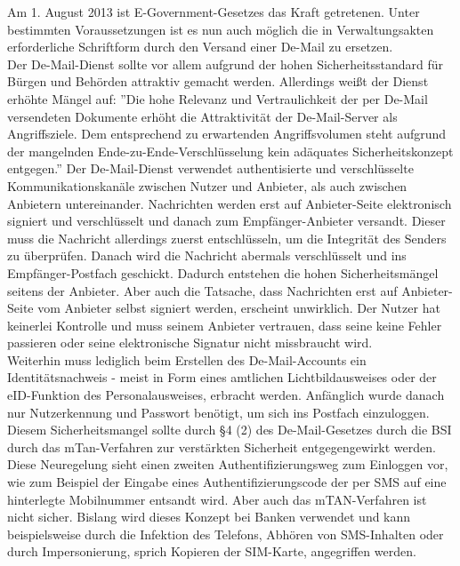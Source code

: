 Am 1. August 2013 ist E-Government-Gesetzes das Kraft getretenen. Unter bestimmten Voraussetzungen ist es nun auch möglich die in Verwaltungsakten erforderliche Schriftform durch den Versand einer De-Mail zu ersetzen. \\
Der De-Mail-Dienst sollte vor allem aufgrund der hohen Sicherheitsstandard für Bürgen und Behörden attraktiv gemacht werden. Allerdings weißt der Dienst erhöhte Mängel auf:
''Die hohe Relevanz und Vertraulichkeit der per De-Mail versendeten Dokumente erhöht die Attraktivität der De-Mail-Server als Angriffsziele. Dem entsprechend zu erwartenden Angriffsvolumen steht aufgrund der mangelnden Ende-zu-Ende-Verschlüsselung kein adäquates Sicherheitskonzept entgegen.'' \textcite{bea:demail:ccc} Der De-Mail-Dienst verwendet authentisierte und verschlüsselte Kommunikationskanäle zwischen Nutzer und Anbieter, als auch zwischen Anbietern untereinander. Nachrichten werden erst auf Anbieter-Seite elektronisch signiert und verschlüsselt und danach zum Empfänger-Anbieter versandt. Dieser muss die Nachricht allerdings zuerst entschlüsseln, um die Integrität des Senders zu überprüfen. Danach wird die Nachricht abermals verschlüsselt und ins Empfänger-Postfach geschickt. Dadurch entstehen die hohen Sicherheitsmängel seitens der Anbieter. Aber auch die Tatsache, dass Nachrichten erst auf Anbieter-Seite vom Anbieter selbst signiert werden, erscheint unwirklich. Der Nutzer hat keinerlei Kontrolle und muss seinem Anbieter vertrauen, dass seine keine Fehler passieren oder seine elektronische Signatur nicht missbraucht wird. \\
Weiterhin muss lediglich beim Erstellen des De-Mail-Accounts ein Identitätsnachweis - meist in Form eines amtlichen Lichtbildausweises oder der eID-Funktion  des Personalausweises, erbracht werden. Anfänglich wurde danach nur Nutzerkennung und Passwort benötigt, um sich ins Postfach einzuloggen. Diesem Sicherheitsmangel sollte durch §4 (2) des De-Mail-Gesetzes durch die BSI durch das mTan-Verfahren zur verstärkten Sicherheit entgegengewirkt werden. Diese Neuregelung sieht einen zweiten Authentifizierungsweg zum Einloggen vor, wie zum Beispiel der Eingabe eines Authentifizierungscode der per SMS auf eine hinterlegte Mobilnummer entsandt wird. Aber auch das mTAN-Verfahren ist nicht sicher. Bislang wird dieses Konzept bei Banken verwendet und kann beispielsweise durch die Infektion des Telefons, Abhören von SMS-Inhalten oder durch Impersonierung, sprich Kopieren der SIM-Karte, angegriffen werden. \textcite{bea:demail:brokenbydesign} \\
